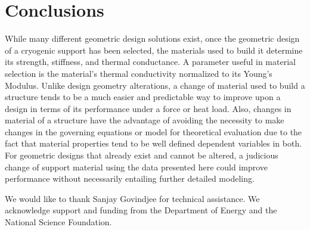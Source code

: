 \documentclass[final]{svjour2}
\begin{document}
\section{Conclusions}
While many different geometric design solutions exist, once the geometric design of a cryogenic support has been selected, the materials used to build it determine its strength, stiffness, and thermal conductance. A parameter useful in material selection is the material's thermal conductivity normalized to its Young's Modulus.  Unlike design geometry alterations, a change of material used to build a structure tends to be a much easier and predictable way to improve upon a design in terms of its performance under a force or heat load. Also, changes in material of a structure have the advantage of avoiding the necessity to make changes in the governing equations or model for theoretical evaluation due to the fact that material properties tend to be well defined dependent variables in both. For geometric designs that already exist and cannot be altered, a judicious change of support material using the data presented here could improve performance without necessarily entailing further detailed modeling.

\begin{acknowledgements}
We would like to thank Sanjay Govindjee for technical assistance. We acknowledge support and funding from the Department of Energy and the National Science Foundation.
\end{acknowledgements}
\end{document}
